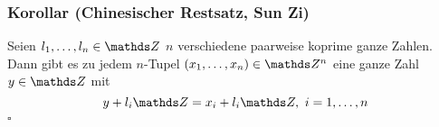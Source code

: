 \subsubsection*{Korollar (Chinesischer Restsatz, Sun Zi)}
Seien $l_1,\dots,l_n\in\Z$ $n$ verschiedene paarweise koprime ganze Zahlen.
Dann gibt es zu jedem $n$-Tupel $(x_1,\dots,x_n)\in \Z^n$ eine ganze Zahl $y\in \Z$ mit
\[
y+l_i\Z=x_i+l_i\Z,~i=1,\dots,n
\]
\hfill $\square$



 





\cleardoubleoddemptypage
{}
\setcounter{page}{1}




\printindex
\listoffigures
